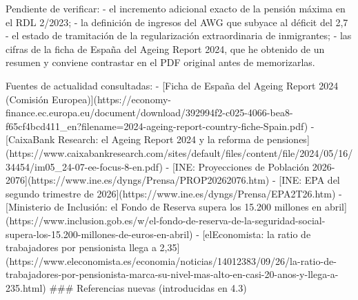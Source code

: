 \documentclass[10pt,a4paper]{article}
\begin{document}
Pendiente de verificar:
- el incremento adicional exacto de la pensión máxima en el RDL 2/2023;
- la definición de ingresos del AWG que subyace al déficit del 2,7%
- el estado de tramitación de la regularización extraordinaria de inmigrantes;
- las cifras de la ficha de España del Ageing Report 2024, que he obtenido de un resumen y conviene contrastar en el PDF original antes de memorizarlas.

Fuentes de actualidad consultadas:
- [Ficha de España del Ageing Report 2024 (Comisión Europea)](https://economy-finance.ec.europa.eu/document/download/392994f2-c025-4066-bea8-f65cf4bcd411_en?filename=2024-ageing-report-country-fiche-Spain.pdf)
- [CaixaBank Research: el Ageing Report 2024 y la reforma de pensiones](https://www.caixabankresearch.com/sites/default/files/content/file/2024/05/16/34454/im05_24-07-ee-focus-8-en.pdf)
- [INE: Proyecciones de Población 2026-2076](https://www.ine.es/dyngs/Prensa/PROP20262076.htm)
- [INE: EPA del segundo trimestre de 2026](https://www.ine.es/dyngs/Prensa/EPA2T26.htm)
- [Ministerio de Inclusión: el Fondo de Reserva supera los 15.200 millones en abril](https://www.inclusion.gob.es/w/el-fondo-de-reserva-de-la-seguridad-social-supera-los-15.200-millones-de-euros-en-abril)
- [elEconomista: la ratio de trabajadores por pensionista llega a 2,35](https://www.eleconomista.es/economia/noticias/14012383/09/26/la-ratio-de-trabajadores-por-pensionista-marca-su-nivel-mas-alto-en-casi-20-anos-y-llega-a-235.html)
### Referencias nuevas (introducidas en 4.3)
\end{document}
